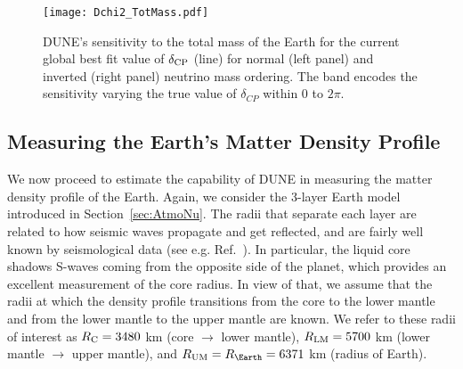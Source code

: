 \begin{figure}
\begin{center}
\texttt{[image: Dchi2\_TotMass.pdf]}
\caption{DUNE's sensitivity to the total mass of the Earth for the current global best fit value of $\delta_{\rm CP}$ (line) for normal (left panel) and inverted (right panel) neutrino mass ordering. The band encodes the sensitivity varying the true value of $\delta_{CP}$ within $0$ to $2\pi$.
 \label{fig:TotMass}}
\end{center}
\end{figure}


\subsection{Measuring the Earth's Matter Density Profile}
\label{subsec:MeasureWithConstraints}
We now proceed to estimate the capability of DUNE in measuring the matter density profile of the Earth.
Again, we consider the 3-layer Earth model introduced in Section~\ref{sec:AtmoNu}.
The radii that separate each layer are related to how seismic waves propagate and get reflected, and are fairly well known by seismological data (see e.g. Ref.~\cite{Geller:2001ix}).
In particular, the liquid core shadows S-waves coming from the opposite side of the planet, which provides an excellent measurement of the core radius.
In view of that, we assume that the radii at which the density profile transitions from the core to the lower mantle and from the lower mantle to the upper mantle are known.
We refer to these radii of interest as $R_{\rm C} = 3480$ km (core $\to$ lower mantle), $R_{\rm LM} = 5700$ km (lower mantle $\to$ upper mantle), and $R_{\rm UM}=R_\Earth = 6371$ km (radius of Earth).

